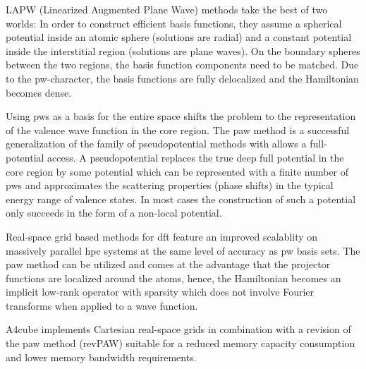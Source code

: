 \documentclass[oribibl]{llncs}
\newcommand{\codename}{A4cube}
\begin{document}
LAPW (Linearized Augmented Plane Wave) methods take the best of two worlds:
In order to construct efficient basis functions, 
they assume a spherical potential inside an atomic sphere (solutions are radial)
and a constant potential inside the interstitial region (solutions are plane waves). On the boundary spheres between the two regions, the basis function components need to be matched.
Due to the \ac{pw}-character, the basis functions are fully delocalized and the
Hamiltonian becomes dense.

Using \ac{pw}s as a basis for the entire space shifts the problem to the representation of the valence wave function in the core region.
The \ac{paw} method is a successful generalization of the family of pseudopotential methods with allows a full-potential access.
A pseudopotential replaces the true deep full potential in the core region
by some potential which can be represented with a finite number of \ac{pw}s
and approximates the scattering properties (phase shifts) in the typical energy
range of valence states.
In most cases the construction of such a potential only succeeds in the form of
a non-local potential.

Real-space grid based methods for \ac{dft}
feature an improved scalablity on massively parallel \ac{hpc} systems at the same level of accuracy as \ac{pw} basis sets. 
The \ac{paw} method can be utilized and comes at the advantage that the projector functions are localized around the atoms, hence, the Hamiltonian becomes an implicit low-rank operator with sparsity which does not involve Fourier transforms when applied to a wave function.


\codename{} implements Cartesian real-space grids 
in combination with a revision of the \ac{paw} method (revPAW) suitable for
a reduced memory capacity consumption and lower memory bandwidth requirements.


 
\end{document}
